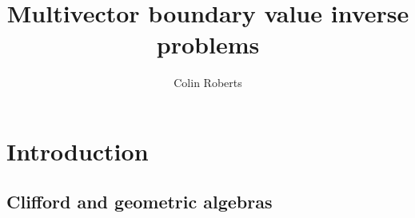 \documentclass[12pt]{report}
\title{Multivector boundary value inverse problems}
\author{Colin Roberts}
\begin{document}

 \begin{titlingpage}
     \maketitle
     \vfill
 \end{titlingpage}

\tableofcontents



\chapter{Introduction}

%

\section{Clifford and geometric algebras}
\label{subsec:clifford_and_geometric_algebras}

\end{document}
